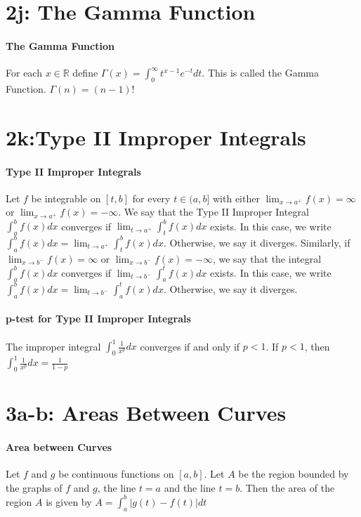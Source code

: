 \documentclass[10pt,letter]{article}
\begin{document}
\section*{2j: The Gamma Function}
\paragraph{The Gamma Function}
For each $x\in\mathbb{R}$ define $\Gamma(x)=\int_0^\infty t^{x-1}e^{-t}dt$. This is called the Gamma Function. $\Gamma(n)=(n-1)!$

\section*{2k:Type II Improper Integrals}
\paragraph{Type II Improper Integrals}
Let $f$ be integrable on $[t,b]$ for every $t\in(a,b]$ with either $\lim_{x\rightarrow a^+}f(x)=\infty$ or $\lim_{x\rightarrow a^+}f(x)=-\infty$. We say that the Type II Improper Integral $\int_a^bf(x)dx$ converges if $\lim_{t\rightarrow a^+}\int_t^bf(x)dx$ exists. In this case, we write $\int_a^bf(x)dx=\lim_{t\rightarrow a^+}\int_t^bf(x)dx$. Otherwise, we say it diverges. Similarly, if $\lim_{x\rightarrow b^-}f(x)=\infty$ or $\lim_{x\rightarrow b^-}f(x)=-\infty$, we say that the integral $\int_a^bf(x)dx$ converges if $\lim_{t\rightarrow b^-}\int_a^tf(x)dx$ exists. In this case, we write $\int_a^bf(x)dx=\lim_{t\rightarrow b^-}\int_a^tf(x)dx$. Otherwise, we say it diverges. 

\paragraph{p-test for Type II Improper Integrals}
The improper integral $\int_0^1\frac{1}{x^p}dx$ converges if and only if $p<1$. If $p<1$, then $\int_0^1\frac{1}{x^p}dx=\frac{1}{1-p}$ 

\section*{3a-b: Areas Between Curves}
\paragraph{Area between Curves}
Let $f$ and $g$ be continuous functions on $[a,b]$. Let $A$ be the region bounded by the graphs of $f$ and $g$, the line $t=a$ and the line $t=b$. Then the area of the region $A$ is given by $A=\int_a^b|g(t)-f(t)|dt$
\end{document}
